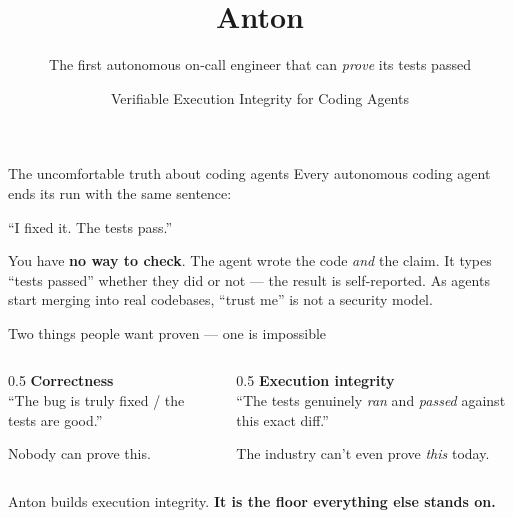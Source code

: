 \documentclass[aspectratio=169,11pt]{beamer}
\title{Anton}
\subtitle{The first autonomous on-call engineer that can \emph{prove} its tests passed}
\date{}
\author{Verifiable Execution Integrity for Coding Agents}
\begin{document}
\maketitle

\begin{frame}{The uncomfortable truth about coding agents}
  Every autonomous coding agent ends its run with the same sentence:
  \begin{center}
    \alert{\large ``I fixed it. The tests pass.''}
  \end{center}
  \pause
  You have \textbf{no way to check}. The agent wrote the code \emph{and} the claim.
  It types ``tests passed'' whether they did or not --- the result is
  \alert{self-reported}.
  \pause
  \vspace{1em}
  As agents start merging into real codebases, ``trust me'' is not a security model.
\end{frame}

\begin{frame}{Two things people want proven --- one is impossible}
  \begin{columns}[T]
    \begin{column}{0.5\textwidth}
      \textbf{Correctness}\\[0.3em]
      ``The bug is truly fixed / the tests are good.''
      \vspace{0.5em}
      \begin{center}\alert{Nobody can prove this.}\end{center}
    \end{column}
    \begin{column}{0.5\textwidth}
      \textbf{Execution integrity}\\[0.3em]
      ``The tests genuinely \emph{ran} and \emph{passed} against this exact diff.''
      \vspace{0.5em}
      \begin{center}\textcolor{good}{The industry can't even prove \emph{this} today.}\end{center}
    \end{column}
  \end{columns}
  \vspace{1.5em}
  \pause
  \begin{center}
    Anton builds execution integrity. \textbf{It is the floor everything else stands on.}
  \end{center}
\end{frame}
\end{document}
